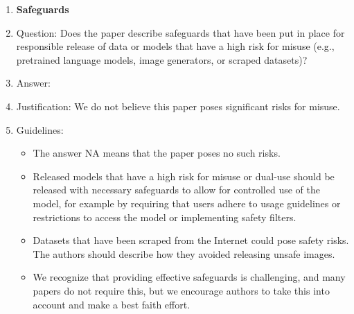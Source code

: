 \documentclass{article}
\begin{document}
\begin{enumerate}
\item {\bf Safeguards}
    \item[] Question: Does the paper describe safeguards that have been put in place for responsible release of data or models that have a high risk for misuse (e.g., pretrained language models, image generators, or scraped datasets)?
    \item[] Answer: \answerNA{} %
    \item[] Justification: We do not believe this paper poses significant risks for misuse.
    \item[] Guidelines:
    \begin{itemize}
        \item The answer NA means that the paper poses no such risks.
        \item Released models that have a high risk for misuse or dual-use should be released with necessary safeguards to allow for controlled use of the model, for example by requiring that users adhere to usage guidelines or restrictions to access the model or implementing safety filters. 
        \item Datasets that have been scraped from the Internet could pose safety risks. The authors should describe how they avoided releasing unsafe images.
        \item We recognize that providing effective safeguards is challenging, and many papers do not require this, but we encourage authors to take this into account and make a best faith effort.
    \end{itemize}


\end{enumerate}
\end{document}
